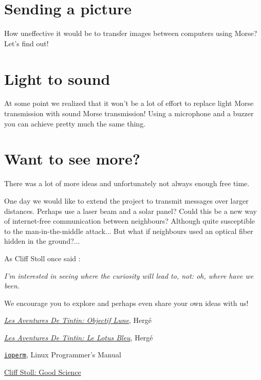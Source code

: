 \documentclass[12pt]{report}
\begin{document}
\section{Sending a picture}

How uneffective it would be to transfer images between computers using Morse? Let's find out!

\section{Light to sound}

At some point we realized that it won't be a lot of effort to replace light Morse transmission with sound Morse transmission! Using a microphone and a buzzer you can achieve pretty much the same thing.

\section{Want to see more?}

There was a lot of more ideas and unfortunately not always enough free time.

One day we would like to extend the project to transmit messages over larger distances. Perhaps use a laser beam and a solar panel? Could this be a new way of internet-free communication between neighbours? Although quite susceptible to the man-in-the-middle attack... But what if neighbours used an optical fiber hidden in the ground?...

As Cliff Stoll once said \cite{cliff_stoll}: 

\textit{I'm interested in seeing where the curiosity will lead to, not: oh, where have we been.}

We encourage you to explore and perhaps even share your own ideas with us!

\newpage

\begin{thebibliography}{50}

 \hyperlink{https://fr.wikipedia.org/wiki/Objectif_Lune}{\textit{Les Aventures De Tintin: Objectif Lune}}, Hergé

 \hyperlink{https://fr.wikipedia.org/wiki/Le_Lotus_bleu}{\textit{Les Aventures De Tintin: Le Lotus Bleu}}, Hergé

 \hyperlink{http://man7.org/linux/man-pages/man2/ioperm.2.html}{\texttt{ioperm}}, Linux Programmer's Manual

 \hyperlink{https://www.youtube.com/watch?v=xHEIOgONq6A}{Cliff Stoll: Good Science}

\end{thebibliography}
\end{document}
